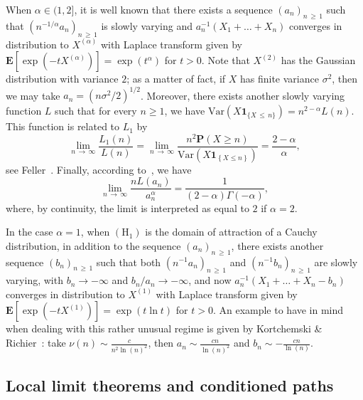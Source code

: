 \documentclass[10pt]{amsart}
\theoremstyle{definition}\newtheorem{defi}[theo]{Definition}\newtheorem{rema}[theo]{Remark}\newtheorem{exam}[theo]{Example}\newtheorem{exem}[theo]{Example}\newtheorem{nota}[theo]{Notation}
\newcommand{\ensembles}[1]{\mathbf{#1}}
\renewcommand{\P}{\ensembles{P}}
\newcommand{\E}{\ensembles{E}}
\newcommand{\1}{\ensembles{1}}
\newcommand{\ind}[1]{\1_{\{#1\}}}
\renewcommand{\le}{\leqslant}
\renewcommand{\ge}{\geqslant}
\newcommand{\Xmap}{X}
\newcommand{\Var}{\mathrm{Var}}
\newcommand{\Hrm}{\mathrm{H}}
\providecommand{\?}{}
\begin{document}
When $\alpha \in (1,2]$, it is well known that there exists a sequence $(a_n)_{n\,\ge\,1}$ such that $(n^{-1/\alpha} a_n)_{n\,\ge\,1}$ is slowly varying and $a_n^{-1} (X_1 + \dots + X_n)$ converges in distribution to $\Xmap^{(\alpha)}$ with Laplace transform given by $\E[\exp(- t \Xmap^{(\alpha)})] = \exp(t^\alpha)$ for $t > 0$. Note that $\Xmap^{(2)}$ has the Gaussian distribution with variance $2$; as a matter of fact, if $X$ has finite variance $\sigma^2$, then we may take $a_n = (n \sigma^2 / 2)^{1/2}$. Moreover, there exists another slowly varying function $L$ such that for every $n \ge 1$, we have $\Var(X \ind{X\,\le\,n}) = n^{2-\alpha} L(n)$. This function is related to $L_1$ by
\begin{equation}\label{eq:ratio_fonctions_var_lente}
\lim_{n\,\to\,\infty} \frac{L_1(n)}{L(n)} = \lim_{n\,\to\, \infty} \frac{n^2 \P(X \ge n)}{\Var\left(X \1_{\left\{X \le n\right\}}\right)} = \frac{2-\alpha}{\alpha},
\end{equation}
see Feller~\cite[Chapter~XVII, Equation~5.16]{Fel71}. Finally, according to~\cite[Equation~7]{Kor17}, we have
\begin{equation}\label{eq:constante_Levy}
\lim_{n\,\to\,\infty} \frac{n L(a_n)}{a_n^\alpha} = \frac{1}{(2-\alpha) \Gamma(-\alpha)},
\end{equation}
where, by continuity, the limit is interpreted as equal to $2$ if $\alpha=2$.

In the case $\alpha=1$, when $(\Hrm_1)$ is the domain of attraction of a Cauchy distribution, in addition to the sequence $(a_n)_{n\,\ge\,1}$, there exists another sequence $(b_n)_{n\,\ge\,1}$ such that both $(n^{-1} a_n)_{n\,\ge\,1}$ and $(n^{-1} b_n)_{n\,\ge\,1}$ are slowly varying, with $b_n \to -\infty$ and $b_n / a_n \to -\infty$, and now $a_n^{-1} (X_1 + \dots + X_n - b_n)$ converges in distribution to $\Xmap^{(1)}$ with Laplace transform given by $\E[\exp(- t \Xmap^{(1)})] = \exp(t \ln t)$ for $t > 0$. An example to have in mind when dealing with this rather unusual regime is given by Kortchemski \& Richier~\cite{KR19}: take $\nu(n) \sim \tfrac{c}{n^2 \ln(n)^2}$, then $a_n \sim \tfrac{c n}{\ln(n)^2}$ and $b_n \sim - \tfrac{c n}{\ln(n)}$.



\subsection{Local limit theorems and conditioned paths}\label{sec:Luka_stable}
\end{document}
